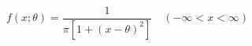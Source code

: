 \documentclass[preview]{standalone}
\begin{document}
\begin{align*}
f(x; \theta )=\dfrac{1}{\pi[1+(x- \theta )^2]} \quad(-\infty<x<\infty)
\end{align*}
\end{document}

